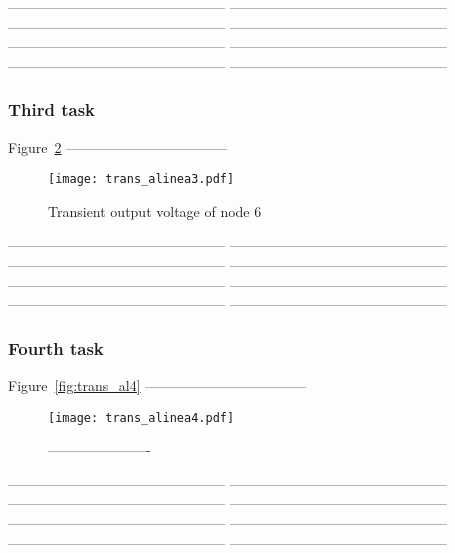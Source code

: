 -----------------------------------------------
-----------------------------------------------
-----------------------------------------------
-----------------------------------------------
-----------------------------------------------
-----------------------------------------------
-----------------------------------------------
-----------------------------------------------



\subsubsection{Third task}

Figure~\ref{fig:trans_al3} ----------------------------------- 

\begin{figure}[H] \centering
  \texttt{[image: trans\_alinea3.pdf]}
  \caption{Transient output voltage of node 6 }
  \label{fig:trans_al3}
  \end{figure}

-----------------------------------------------
-----------------------------------------------
-----------------------------------------------
-----------------------------------------------
-----------------------------------------------
-----------------------------------------------
-----------------------------------------------
-----------------------------------------------


\subsubsection{Fourth task}

Figure~\ref{fig:trans_al4} ----------------------------------- 

\begin{figure}[H] \centering
  \texttt{[image: trans\_alinea4.pdf]}
  \caption{ ---------------------- }
  \label{fig:trans_al3}
  \end{figure}

-----------------------------------------------
-----------------------------------------------
-----------------------------------------------
-----------------------------------------------
-----------------------------------------------
-----------------------------------------------
-----------------------------------------------
-----------------------------------------------



